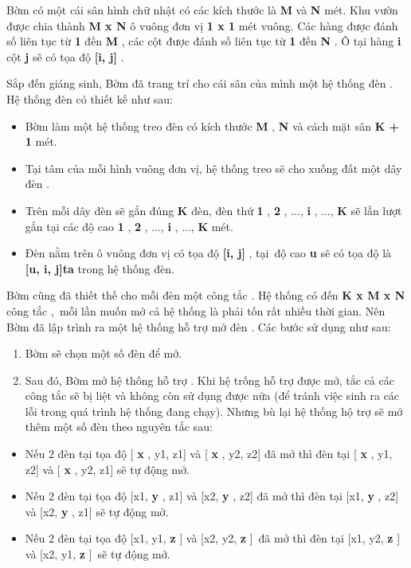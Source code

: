 Bờm có một cái sân hình chữ nhật có các kích thước là \textbf{ M } và \textbf{ N } mét. Khu vườn được chia thành \textbf{ M x N } ô vuông đơn vị \textbf{ 1 x 1 } mét vuông. Các hàng được đánh số liên tục từ \textbf{ 1 } đến \textbf{ M } , các cột được đánh số liên tục từ \textbf{ 1 } đến \textbf{ N } . Ô tại hàng \textbf{ i } cột \textbf{ j } sẽ có tọa độ \textbf{ [i, j] } .

Sắp đến giáng sinh, Bờm đã trang trí cho cái sân của mình một hệ thống đèn . Hệ thống đèn có thiết kế như sau:
\begin{itemize}
	\item Bờm làm một hệ thống treo đèn có kích thước \textbf{ M } , \textbf{ N } và cách mặt sân \textbf{ K + 1 } mét.
	\item Tại tâm của mỗi hình vuông đơn vị, hệ thống treo sẽ cho xuống đất một dây đèn .
	\item Trên mỗi dây đèn sẽ gắn đúng \textbf{ K } đèn, đèn thứ \textbf{ 1 } , \textbf{ 2 } , ..., \textbf{ i } , ..., \textbf{ K } sẽ lần lượt gắn tại các độ cao \textbf{ 1 } , \textbf{ 2 } , ..., \textbf{ i } , ..., \textbf{ K } mét.
	\item Đèn nằm trên ô vuông đơn vị có tọa độ \textbf{ [i, j] } , tại độ cao \textbf{ u } sẽ có tọa độ là \textbf{ [u, i, j]ta } trong hệ thống đèn.
\end{itemize}
\begin{itemize}
\end{itemize}

Bờm cũng đã thiết thế cho mỗi đèn một công tắc . Hệ thống có đến \textbf{ K x M x N }công tắc , mỗi lần muốn mở cả hệ thống là phải tốn rất nhiều thời gian. Nên Bờm đã lập trình ra một hệ thống hỗ trợ mở đèn . Các bước sử dụng như sau:
\begin{enumerate}
	\item Bờm sẽ chọn một số đèn để mở.
	\item Sau đó, Bờm mở hệ thống hỗ trợ . Khi hệ trống hỗ trợ được mở, tắc cả các công tắc sẽ bị liệt và không còn sử dụng được nữa (để tránh việc sinh ra các lỗi trong quá trình hệ thống đang chạy). Nhưng bù lại hệ thống hộ trợ sẽ mở thêm một số đèn theo nguyên tắc sau:
\end{enumerate}
\begin{itemize}
	\item Nếu 2 đèn tại tọa độ [ \textbf{ x } , y1, z1] và [ \textbf{ x } , y2, z2] đã mở thì đèn tại [ \textbf{ x } , y1, z2] và [ \textbf{ x } , y2, z1] sẽ tự động mở.
	\item Nếu 2 đèn tại tọa độ [x1, \textbf{ y } , z1] và [x2, \textbf{ y } , z2] đã mở thì đèn tại [x1, \textbf{ y } , z2] và [x2, \textbf{ y } , z1] sẽ tự động mở.
	\item Nếu 2 đèn tại tọa độ [x1, y1, \textbf{ z } ] \textbf{} và [x2, y2, \textbf{ z } ] đã mở thì đèn tại [x1, y2, \textbf{ z } ] \textbf{} và [x2, y1, \textbf{ z } ] sẽ tự động mở.
\end{itemize}
\begin{itemize}
\end{itemize}


